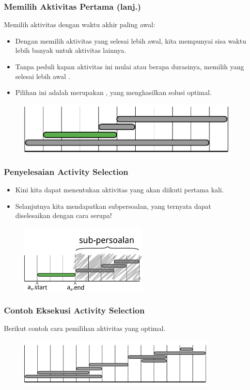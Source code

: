 \begin{frame}
  \frametitle{Memilih Aktivitas Pertama (lanj.)}
  Memilih aktivitas dengan waktu akhir paling awal:
  \begin{itemize}
    \item Dengan memilih aktivitas yang selesai lebih awal, kita mempunyai sisa waktu lebih banyak untuk aktivitas lainnya.
    \item Tanpa peduli kapan aktivitas ini mulai atau berapa durasinya, memilih yang selesai lebih awal .
    \item Pilihan ini adalah merupakan \fgreedyChoice, yang  menghasilkan solusi optimal.
  \end{itemize}

  \begin{figure}
    \includegraphics[width=9 cm]{asset/activity-selection-choice-3.pdf}
  \end{figure}
\end{frame}

\begin{frame}
  \frametitle{Penyelesaian Activity Selection}
  \begin{itemize}
    \item Kini kita dapat menentukan aktivitas yang akan diikuti pertama kali.
    \item Selanjutnya kita mendapatkan subpersoalan, yang ternyata dapat diselesaikan dengan cara serupa!
  \end{itemize}
  \begin{figure}
    \includegraphics[width=6.5cm]{asset/activity-selection-subproblem.pdf}
  \end{figure}
\end{frame}

\begin{frame}
  \frametitle{Contoh Eksekusi Activity Selection}
  Berikut contoh cara pemilihan aktivitas yang optimal.
  \begin{figure}
    \includegraphics[width=10cm]{asset/activity-selection-algo-1.pdf}
  \end{figure}
\end{frame}

